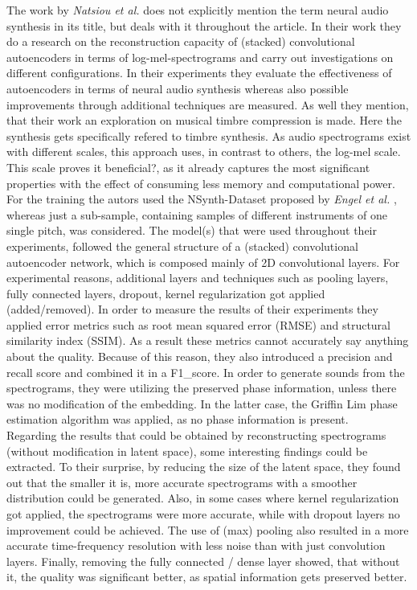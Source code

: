 The work by \textit{Natsiou et al.} does not explicitly mention the term neural audio synthesis in its title, but deals with it throughout the article. \cite{Natsiou2023} In their work they do a research on the reconstruction capacity of (stacked) convolutional autoencoders in terms of log-mel-spectrograms and carry out investigations on different configurations. In their experiments they evaluate the effectiveness of autoencoders in terms of neural audio synthesis whereas also possible improvements through additional techniques are measured. As well they mention, that their work an exploration on musical timbre compression is made. Here the synthesis gets specifically refered to timbre synthesis. As audio spectrograms exist with different scales, this approach uses, in contrast to others, the log-mel scale. This scale proves it beneficial?, as it already captures the most significant properties with the effect of consuming less memory and computational power. For the training the autors used the NSynth-Dataset proposed by \textit{Engel et al. } \cite{Engel2017}, whereas just a sub-sample, containing samples of different instruments of one single pitch, was considered. The model(s) that were used throughout their experiments, followed the general structure of a (stacked) convolutional autoencoder network, which is composed mainly of 2D convolutional layers. For experimental reasons, additional layers and techniques such as pooling layers, fully connected layers, dropout, kernel regularization got applied (added/removed). In order to measure the results of their experiments they applied error metrics such as root mean squared error (RMSE) and structural similarity index (SSIM). As a result these metrics cannot accurately say anything about the quality. Because of this reason, they also introduced a precision and recall score and combined it in a F1\_score. In order to generate sounds from the spectrograms, they were utilizing the preserved phase information, unless there was no modification of the embedding. In the latter case, the Griffin Lim phase estimation algorithm was applied, as no phase information is present.\\
Regarding the results that could be obtained by reconstructing spectrograms (without modification in latent space), some interesting findings could be extracted. To their surprise, by reducing the size of the latent space, they found out that the smaller it is, more accurate spectrograms with a smoother distribution could be generated. Also, in some cases where kernel regularization got applied, the spectrograms were more accurate, while with dropout layers no improvement could be achieved. The use of (max) pooling also resulted in a more accurate time-frequency resolution with less noise than with just convolution layers. Finally, removing the fully connected / dense layer showed, that without it, the quality was significant better, as spatial information gets preserved better.\\

